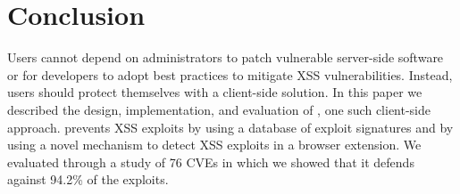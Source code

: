 \section{Conclusion}

Users cannot depend on administrators to patch vulnerable server-side
software or for developers to adopt best practices to mitigate XSS
vulnerabilities. Instead, users should protect themselves with a
client-side solution. In this paper we described the design,
implementation, and evaluation of \sys, one such client-side approach.
%
\sys prevents \ac{XSS} exploits by using a database of exploit
signatures and by using a novel mechanism to detect XSS exploits in a
browser extension.
%
We evaluated \sys through a study of 76 CVEs in which we
showed that it defends against 94.2\% of the exploits.




